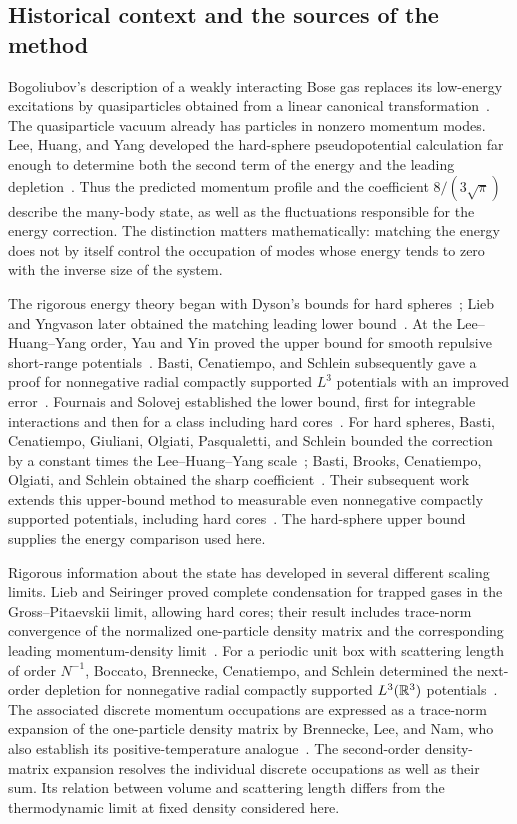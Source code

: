 \subsection{Historical context and the sources of the method}

Bogoliubov's description of a weakly interacting Bose gas replaces its
low-energy excitations by quasiparticles obtained from a linear canonical
transformation~\cite{Bogoliubov}. The quasiparticle vacuum already has
particles in nonzero momentum modes. Lee, Huang, and Yang developed the
hard-sphere pseudopotential calculation far enough to determine both the
second term of the energy and the leading depletion~\cite{LHY}. Thus the
predicted momentum profile and the coefficient $8/(3\sqrt\pi)$ describe
the many-body state, as well as the fluctuations responsible for the
energy correction. The distinction matters mathematically: matching
the energy does not by itself control the occupation of modes whose
energy tends to zero with the inverse size of the system.

The rigorous energy theory began with Dyson's bounds for hard
spheres~\cite{Dyson}; Lieb and Yngvason later obtained the matching
leading lower bound~\cite{LY}. At the Lee--Huang--Yang order, Yau and
Yin proved the upper bound for smooth repulsive short-range
potentials~\cite{YY}. Basti, Cenatiempo, and Schlein subsequently gave
a proof for nonnegative radial compactly supported $L^3$ potentials
with an improved error~\cite{BCS2021}. Fournais and Solovej established
the lower bound, first for integrable interactions and then for a class
including hard cores~\cite{FS2020,FS2023}. For hard spheres, Basti,
Cenatiempo, Giuliani, Olgiati, Pasqualetti, and Schlein bounded the
correction by a constant times the Lee--Huang--Yang scale~\cite{BCGOPS};
Basti, Brooks, Cenatiempo, Olgiati, and Schlein obtained the sharp
coefficient~\cite{BBCOS}. Their subsequent work extends this upper-bound
method to measurable even nonnegative compactly supported potentials,
including hard cores~\cite{BBCOSgeneral}.
The hard-sphere upper bound supplies the energy comparison used here.

Rigorous information about the state has developed in several different
scaling limits. Lieb and Seiringer proved complete condensation for
trapped gases in the Gross--Pitaevskii limit, allowing hard cores; their
result includes trace-norm convergence of the normalized one-particle
density matrix and the corresponding leading momentum-density
limit~\cite{LS2002}. For a periodic unit box with scattering length of
order $N^{-1}$, Boccato, Brennecke, Cenatiempo, and Schlein determined
the next-order depletion for nonnegative radial compactly supported
$L^3(\mathbb R^3)$ potentials~\cite[Equation~(1.14) and Appendix~A]{BBCS}.
The associated discrete momentum occupations are expressed as a
trace-norm expansion of the one-particle density matrix by Brennecke,
Lee, and Nam, who also establish its positive-temperature
analogue~\cite[Equations~(6)--(8) and Theorem~1.1]{BLN}.
The second-order density-matrix expansion resolves the individual
discrete occupations as well as their sum. Its relation between volume
and scattering length differs from the thermodynamic limit at fixed
density considered here.

